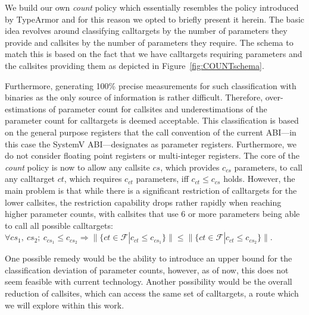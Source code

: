 We build our own \emph{count} policy which essentially resembles the policy introduced by TypeArmor \cite{veen:typearmor} and
for this reason we opted to briefly present it herein.
The basic idea revolves around classifying calltargets by the number of parameters they provide and callsites 
by the number of parameters they require. The schema to match this is based on the fact that we  
have calltargets requiring parameters and the callsites providing them as depicted in Figure~\ref{fig:COUNTschema}.

Furthermore, generating 100\% precise measurements for such classification with binaries as the only source of information is rather difficult. 
Therefore, over-estimations of parameter count for callsites and underestimations of the parameter count for calltargets is deemed acceptable. 
This classification is based on the general purpose registers that the call convention of the current ABI---in this case the 
SystemV ABI---designates as parameter registers. Furthermore, we do not consider floating point registers or multi-integer registers. 
The core of the \emph{count} policy is now to allow any callsite $cs$, which provides $c_{cs}$ parameters, to call any calltarget $ct$, 
which requires $c_{ct}$ parameters, iff $c_{ct} \leq c_{cs}$ holds. However, the main problem is that while there is a significant 
restriction of calltargets for the lower callsites, the restriction capability drops rather rapidly when reaching higher parameter 
counts, with callsites that use 6 or more parameters being able to call all possible calltargets:
$\forall cs_1, \ cs_2; \ c_{cs_1} \leq c_{cs_2} \Longrightarrow  \| \{ct \in \mathcal{F} | c_{ct} \leq c_{cs_1} \} \| \leq \| \{ct \in \mathcal{F} | c_{ct} \leq c_{cs_2}  \} \|$.

One possible remedy would be the ability to introduce an upper bound for the classification deviation of parameter counts, 
however, as of now, this does not seem feasible with current technology. Another possibility would be the overall reduction
of callsites, which can access the same set of calltargets, a route which we will explore within this work.

